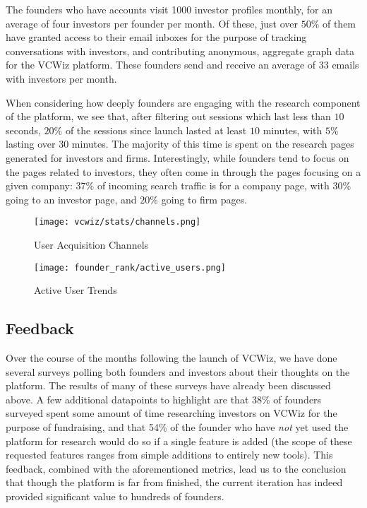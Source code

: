 The founders who have accounts visit 1000 investor profiles monthly, for an average of four investors per founder per month. Of these, just over $50\%$ of them have granted access to their email inboxes for the purpose of tracking conversations with investors, and contributing anonymous, aggregate graph data for the VCWiz platform. These founders send and receive an average of 33 emails with investors per month.

When considering how deeply founders are engaging with the research component of the platform, we see that, after filtering out sessions which last less than $10$ seconds, $20\%$ of the sessions since launch lasted at least $10$ minutes, with $5\%$ lasting over 30 minutes. The majority of this time is spent on the research pages generated for investors and firms. Interestingly, while founders tend to focus on the pages related to investors, they often come in through the pages focusing on a given company: $37\%$ of incoming search traffic is for a company page, with $30\%$ going to an investor page, and $20\%$ going to firm pages.

\begin{figure}[ht]
  \centering
  \begin{minipage}[t]{0.5\textwidth}
    \centering
    \texttt{[image: vcwiz/stats/channels.png]}
    \caption{User Acquisition Channels}
    \label{fig:acquisition}
  \end{minipage}\hfill
  \begin{minipage}[t]{0.5\textwidth}
    \centering
    \texttt{[image: founder\_rank/active\_users.png]}
    \caption{Active User Trends}
    \label{fig:actives}
  \end{minipage}
\end{figure}

\subsection{Feedback}

Over the course of the months following the launch of VCWiz, we have done several surveys polling both founders and investors about their thoughts on the platform. The results of many of these surveys have already been discussed above. A few additional datapoints to highlight are that 38\% of founders surveyed spent some amount of time researching investors on VCWiz for the purpose of fundraising, and that 54\% of the founder who have \textit{not} yet used the platform for research would do so if a single feature is added (the scope of these requested features ranges from simple additions to entirely new tools). This feedback, combined with the aforementioned metrics, lead us to the conclusion that though the platform is far from finished, the current iteration has indeed provided significant value to hundreds of founders.

